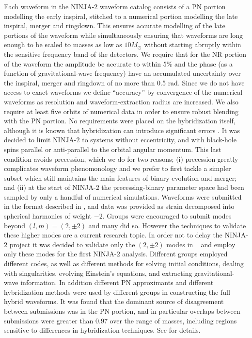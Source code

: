 \documentclass[12pt]{iopart}
\begin{document}
Each waveform in the NINJA-2 waveform catalog consists of a PN 
portion modelling the early
inspiral, stitched to a numerical portion modelling the late inspiral,
merger and ringdown.  This ensures accurate modelling of the late
portions of the waveform while simultaneously ensuring that waveforms
are long enough to be scaled to masses as low as $10 M_\odot$ without
starting abruptly within the sensitive frequency band of the
detectors.  We require that for the NR portion of the waveform the
amplitude be accurate to within 5\% 
and the phase (as a function of gravitational-wave frequency)
have an accumulated uncertainty over the inspiral, merger and ringdown
of no more than 0.5 rad.  Since we do not have access to exact
waveforms we define ``accuracy'' by convergence of the numerical
waveforms as resolution and waveform-extraction radius are increased.
We also require at least five orbits of numerical data in order to
ensure robust blending with the PN portion.  No requirements were
placed on the hybridization itself, although it is known that
hybridization can introduce significant errors
\cite{MacDonald:2011ne, Santamaria:2010yb, Ohme:2011rm}.
It was
decided to limit NINJA-2 to systems without eccentricity, and with
black-hole spins parallel or anti-parallel
to the orbital angular momentum.  This
last condition avoids precession, which we do for two reasons; (i)
precession greatly complicates waveform phenomonology
and we prefer to first tackle a simpler subset which still maintains
the main features of binary evolution and merger; and (ii) at the
start of NINJA-2 the precessing-binary parameter space had been
sampled by only a handful of numerical simulations.  Waveforms were
submitted in the format described in \cite{Brown:2007jx}, and data was
provided as strain decomposed into spherical harmonics of weight $-2$.
Groups were encouraged to submit modes beyond $(l,m)=(2,\pm 2)$
and many 
did so.  However the techniques to validate these higher modes
are a current research topic.  In order not to delay the NINJA-2
project it was decided to validate only the $(2,\pm 2)$ modes in
~\cite{Ajith:2012az} and employ only these modes for the first
NINJA-2 analysis. Different groups employed different codes, as well
as different methods for solving initial conditions, dealing with
singularities, evolving Einstein's equations, and extracting
gravitational-wave information.  In addition different PN
approximants and different hybridization methods were used by
different groups in constructing the full hybrid waveforms. 
It was found that the
dominant source of disagreement between submissions was in the PN
portion, and in particular overlaps between submissions were greater
than 0.97 over the range of
masses, including regions sensitive to differences in hybridization
techniques.  See
\cite{Ajith:2012az} for details.
\end{document}
